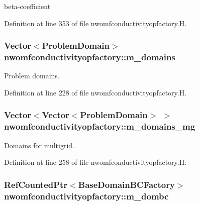 beta-\/coefficient 



Definition at line 353 of file nwomfconductivityopfactory.\+H.

\subsubsection[{\texorpdfstring{m\+\_\+domains}{m_domains}}]{\setlength{\rightskip}{0pt plus 5cm}Vector$<$Problem\+Domain$>$ nwomfconductivityopfactory\+::m\+\_\+domains\hspace{0.3cm}{\ttfamily [protected]}}\hypertarget{classnwomfconductivityopfactory_af2a633295a59ca4bfbb02eab7cccfbf4}{}\label{classnwomfconductivityopfactory_af2a633295a59ca4bfbb02eab7cccfbf4}


Problem domains. 



Definition at line 228 of file nwomfconductivityopfactory.\+H.

\subsubsection[{\texorpdfstring{m\+\_\+domains\+\_\+mg}{m_domains_mg}}]{\setlength{\rightskip}{0pt plus 5cm}Vector$<$Vector$<$Problem\+Domain$>$ $>$ nwomfconductivityopfactory\+::m\+\_\+domains\+\_\+mg\hspace{0.3cm}{\ttfamily [protected]}}\hypertarget{classnwomfconductivityopfactory_a29cd4a27da466ce46911977c803f14bb}{}\label{classnwomfconductivityopfactory_a29cd4a27da466ce46911977c803f14bb}


Domains for multigrid. 



Definition at line 258 of file nwomfconductivityopfactory.\+H.

\subsubsection[{\texorpdfstring{m\+\_\+dombc}{m_dombc}}]{\setlength{\rightskip}{0pt plus 5cm}Ref\+Counted\+Ptr$<$Base\+Domain\+B\+C\+Factory$>$ nwomfconductivityopfactory\+::m\+\_\+dombc\hspace{0.3cm}{\ttfamily [protected]}}\hypertarget{classnwomfconductivityopfactory_a263604761a8b9549ee8e2024c53a7359}{}\label{classnwomfconductivityopfactory_a263604761a8b9549ee8e2024c53a7359}


